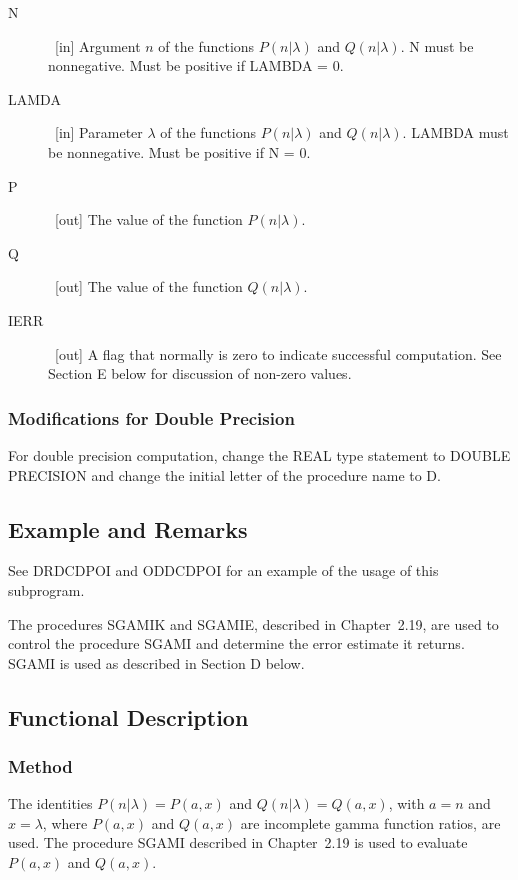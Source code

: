 \documentclass[twoside]{MATH77}
\begin{document}
\begin{description}
\item[N]  \ [in] Argument $n$ of the functions $P(n|\lambda )$ and $%
Q(n|\lambda ).$ N must be nonnegative.  Must be positive if LAMBDA =
0.

\item[LAMDA]  \ [in] Parameter $\lambda $ of the functions $P(n|\lambda )$
and $Q(n|\lambda ).$ LAMBDA must be nonnegative.  Must be positive if
N = 0.

\item[P]  \ [out] The value of the function $P(n|\lambda ).$

\item[Q]  \ [out] The value of the function $Q(n|\lambda ).$

\item[IERR]  \ [out] A flag that normally is zero to indicate successful
computation. See Section E below for discussion of non-zero values.
\end{description}

\subsubsection{Modifications for Double Precision}

For double precision computation, change the REAL type statement to DOUBLE
PRECISION and change the initial letter of the procedure name to D.

\subsection{Example and Remarks}

See DRDCDPOI and ODDCDPOI for an example of the usage of this subprogram.

The procedures SGAMIK and SGAMIE, described in Chapter~2.19, are used to
control the procedure SGAMI and determine the error estimate it returns.
SGAMI is used as described in Section D below.

\subsection{Functional Description}

\subsubsection{Method}

The identities $P(n|\lambda )=P(a,x)$ and $Q(n|\lambda )=Q(a,x)$, with $a=n$
and $x=\lambda $, where $P(a,x)$ and $Q(a,x)$ are incomplete gamma function
ratios, are used. The procedure SGAMI described in Chapter~2.19 is used to
evaluate $P(a,x)$ and $Q(a,x).$
\end{document}
